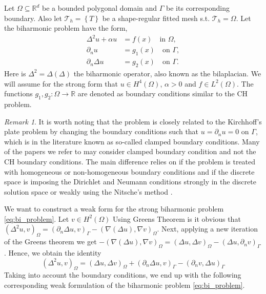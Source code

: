 \documentclass[11pt]{article}
\theoremstyle{remark}
\newtheorem*{remark}{Remark}
\numberwithin{equation}{section}
\begin{document}
Let $\Omega \subseteq    \mathbb{R} ^d$ be a bounded polygonal domain and $\Gamma $ be its corresponding boundary. Also let $\mathcal{T}_{h} = \left\{ T \right\} $ be a shape-regular fitted mesh s.t. $\mathcal{T}_{h} = \Omega $. Let the biharmonic problem have the form,
\begin{subequations}
\begin{align}
    \Delta^2  u  + \alpha  u  & = f( x)  \quad \text{in } \Omega,   \label{eq:bi_problem_a}\\
    \partial _{n} u & = g_{1}(x)   \quad \text{on } \Gamma ,  \label{eq:bi_problem_b}\\
    \partial _{n} \Delta  u & = g_{2}( x)   \quad \text{on } \Gamma .  \label{eq:bi_problem_c}
\end{align}
\label{eq:bi_problem}
\end{subequations}
Here is $\Delta ^2 = \Delta  \left( \Delta  \right) $ the biharmonic operator, also known as the bilaplacian. We will assume for the strong form that $u \in H^{4}\left( \Omega  \right) $, $\alpha  >0 $ and $f \in L^{2}\left( \Omega  \right)
$. The functions $g_{1},g_{2}: \Omega  \to \mathbb{R}$ are denoted as boundary conditions similar to the CH problem.

\begin{remark}
It is worth noting that the problem is closely related to the Kirchhoff's plate problem by changing the boundary conditions such that $u = \partial _{n } u = 0$ on $\Gamma $, which is in the literature known as so-called clamped boundary conditions.
Many of the papers we refer to may consider clamped boundary condition and not the CH boundary conditions. The main difference relies on if the problem is treated with homogeneous or non-homogeneous boundary conditions and if the discrete space is
imposing the Dirichlet and Neumann conditions strongly in the discrete solution space or weakly using the Nitsche's method \cite{nitsche1971variationsprinzip}.
\end{remark}

We want to construct a weak form for the strong biharmonic problem \eqref{eq:bi_problem}. Let $v \in H^{2}( \Omega ) $  Using Greens Theorem is it obvious that \(
\left( \Delta ^2 u,v \right) _{ \Omega  }   = ( \partial _{n} \Delta u, v ) _{\Gamma   } - ( \nabla \left( \Delta  u \right) , \nabla v ) _{ \Omega }
\).
Next, applying a new iteration of the Greens theorem we get
$ -( \nabla ( \Delta u ) , \nabla v ) _{\Omega  }  =   ( \Delta u, \Delta v ) _{\Omega } - ( \Delta u, \partial _{n}v )_{\Gamma } $.
Hence, we obtain the identity
\begin{equation}
\label{eq:iden_bi}
( \Delta ^2 u, v ) _{\Omega } = ( \Delta u, \Delta v)_{\Omega } +  ( \partial _{n} \Delta u, v)_{\Gamma } - ( \partial _{n} v, \Delta u) _{\Gamma }
\end{equation}
Taking into account the boundary conditions, we end up with the following corresponding weak formulation of the biharmonic problem \eqref{eq:bi_problem}.
\end{document}
